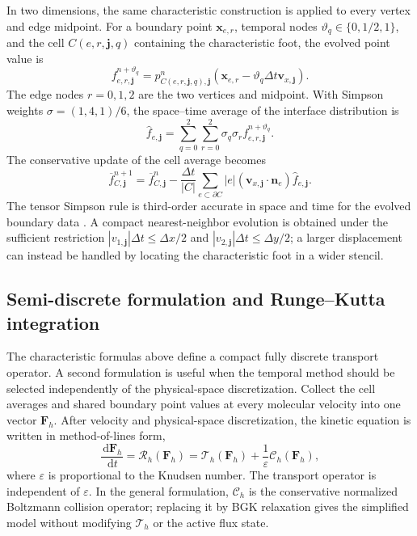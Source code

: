 \documentclass[preprint,3p,12pt]{elsarticle}
\newcommand{\dd}{\,\mathrm{d}}
\newcommand{\vct}[1]{\boldsymbol{#1}}
\newcommand{\avg}[1]{\overline{#1}}
\begin{document}
In two dimensions, the same characteristic construction is applied to every vertex and edge midpoint. For a boundary point $\vct{x}_{e,r}$, temporal nodes $\vartheta_q\in\{0,1/2,1\}$, and the cell $C(e,r,\vct{j},q)$ containing the characteristic foot, the evolved point value is
\begin{equation}
  f_{e,r,\vct{j}}^{n+\vartheta_q}
  =p_{C(e,r,\vct{j},q),\vct{j}}^n
  \left(\vct{x}_{e,r}-\vartheta_q\Delta t\vct{v}_{x,\vct{j}}\right).
  \label{eq:two-dimensional-point-update}
\end{equation}
The edge nodes $r=0,1,2$ are the two vertices and midpoint. With Simpson weights $\sigma=(1,4,1)/6$, the space--time average of the interface distribution is
\begin{equation}
  \widehat{f}_{e,\vct{j}}
  =\sum_{q=0}^{2}\sum_{r=0}^{2}
  \sigma_q\sigma_r f_{e,r,\vct{j}}^{n+\vartheta_q}.
  \label{eq:space-time-simpson}
\end{equation}
The conservative update of the cell average becomes
\begin{equation}
  \avg{f}_{C,\vct{j}}^{n+1}
  =\avg{f}_{C,\vct{j}}^{n}
  -\frac{\Delta t}{|C|}
  \sum_{e\subset\partial C}|e|
  \left(\vct{v}_{x,\vct{j}}\cdot\vct{n}_e\right)
  \widehat{f}_{e,\vct{j}}.
  \label{eq:two-dimensional-conservative-update}
\end{equation}
The tensor Simpson rule is third-order accurate in space and time for the evolved boundary data \cite{barsukow2019cartesian}. A compact nearest-neighbor evolution is obtained under the sufficient restriction $|v_{1,\vct{j}}|\Delta t\le\Delta x/2$ and $|v_{2,\vct{j}}|\Delta t\le\Delta y/2$; a larger displacement can instead be handled by locating the characteristic foot in a wider stencil.

\subsection{Semi-discrete formulation and Runge--Kutta integration}
\label{sec:semidiscrete}

The characteristic formulas above define a compact fully discrete transport operator. A second formulation is useful when the temporal method should be selected independently of the physical-space discretization. Collect the cell averages and shared boundary point values at every molecular velocity into one vector $\vct{F}_h$. After velocity and physical-space discretization, the kinetic equation is written in method-of-lines form,
\begin{equation}
  \frac{\dd\vct{F}_h}{\dd t}
  =\mathcal{R}_h(\vct{F}_h)
  =\mathcal{T}_h(\vct{F}_h)
  +\frac{1}{\varepsilon}\mathcal{C}_h(\vct{F}_h),
  \label{eq:semidiscrete-system}
\end{equation}
where $\varepsilon$ is proportional to the Knudsen number. The transport operator is independent of $\varepsilon$. In the general formulation, $\mathcal{C}_h$ is the conservative normalized Boltzmann collision operator; replacing it by BGK relaxation gives the simplified model without modifying $\mathcal{T}_h$ or the active flux state.
\end{document}
